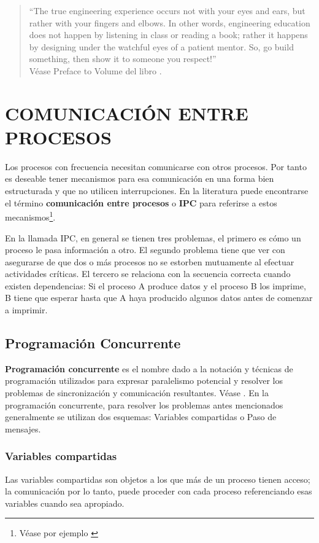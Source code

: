 \documentclass{article}
\begin{document}
\begin{quote}
``The true engineering experience occurs not with your eyes and ears, 
but rather with your fingers and elbows. In other words, engineering 
education does not happen by listening in class or reading a book; 
rather it happens by designing under the watchful eyes of a patient 
mentor. So, go build something, then show it to someone you res\-pect!''\\
V\'ease Preface to Volume del libro \cite{Valvano}.
\end{quote}
\section{COMUNICACI\'ON ENTRE PROCESOS}
Los procesos con frecuencia necesitan comunicarse con otros 
procesos. Por tanto es deseable tener mecanismos para esa 
comunicaci\'on en una forma bien estructurada y que no 
utilicen interrupciones. En la literatura puede encontrarse el 
t\'ermino {\bf comunicaci\'on entre procesos} o {\bf IPC} 
para referirse a estos mecanismos\footnote{V\'ease por ejemplo
\cite{Tanenbaum}}.

En la llamada IPC, en general se tienen tres problemas, el 
primero es c\'omo un proceso le pasa informaci\'on a otro. El 
segundo problema tiene que ver con asegurarse de que dos o 
m\'as procesos no se estorben mutuamente al efectuar 
actividades cr\'iticas. El tercero se relaciona con la 
secuencia correcta cuando existen dependencias: Si el proceso 
A produce datos y el proceso B los imprime, B tiene que esperar 
hasta que A haya producido algunos datos antes de comenzar a 
imprimir.
\subsection*{Programaci\'on Concurrente}
{\bf Programaci\'on concurrente} es el nombre dado a la notaci\'on 
y t\'ecnicas de programaci\'on utilizados para expresar paralelismo 
potencial y resolver los problemas de sincronizaci\'on y 
comunicaci\'on resultantes. V\'ease \cite{Burns}. En la programaci\'on 
concurrente, para resolver los problemas antes mencionados generalmente 
se utilizan dos esquemas: Variables compartidas o Paso de mensajes.
\subsubsection*{Variables compartidas}
Las variables compartidas son objetos a los que m\'as de un 
proceso tienen acceso; la comunicaci\'on por lo tanto, puede 
proceder con cada proceso referenciando esas variables cuando 
sea apropiado.
\end{document}
